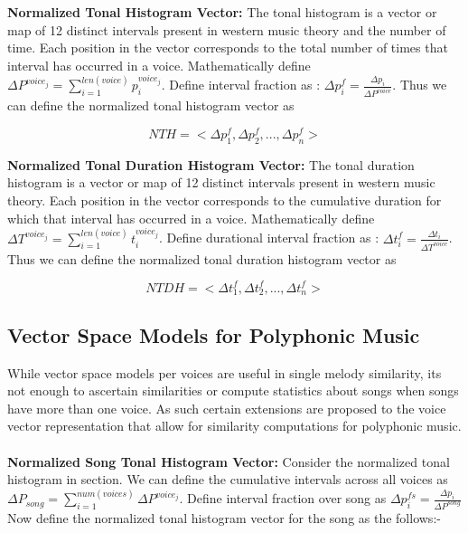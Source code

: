 \noindent \textbf{Normalized Tonal Histogram Vector:} The tonal histogram is a vector or map of 12 distinct intervals present in western music theory and the number of time. Each position in the vector corresponds to the total number of times that interval has occurred in a voice. Mathematically define $\Delta P^{voice_j} = \sum_{i=1}^{len(voice)} p_i^{voice_j}$. Define interval fraction as : $\Delta p^f_i = \frac{\Delta p_i}{\Delta P^{voice}}$. Thus we can define the normalized tonal histogram vector as

\begin{equation}
NTH = <\Delta p^f_1, \Delta p^f_2, ... , \Delta p^f_n>
\end{equation}

\noindent \textbf{Normalized Tonal Duration Histogram Vector:} The tonal duration histogram is a vector or map of 12 distinct intervals present in western music theory. Each position in the vector corresponds to the cumulative duration for which that interval has occurred in a voice. Mathematically define $\Delta T^{voice_j} = \sum_{i=1}^{len(voice)} t_i^{voice_j}$. Define durational interval fraction as : $\Delta t^f_i = \frac{\Delta t_i}{\Delta T^{voice}}$. Thus we can define the normalized tonal duration histogram vector as

\begin{equation}
NTDH = <\Delta t^f_1, \Delta t^f_2, ... , \Delta t^f_n>
\end{equation}

\subsection{Vector Space Models for Polyphonic Music} 

\noindent While vector space models per voices are useful in single melody similarity, its not enough to ascertain similarities or compute statistics about songs when songs have more than one voice. As such certain extensions are proposed to the voice vector representation that allow for similarity computations for polyphonic music.\\\\
\noindent \textbf{Normalized Song Tonal Histogram Vector:}  \noindent Consider the normalized tonal histogram in section. We can define the cumulative intervals across all voices as \\ $\Delta P_{song} = \sum_{i = 1}^{num(voices)} \Delta P^{voice_j}$. Define interval fraction over song as $\Delta p^{fs}_i = \frac{\Delta p_i}{\Delta P^{song}}$   Now define the normalized tonal histogram vector for the song as the follows:-

